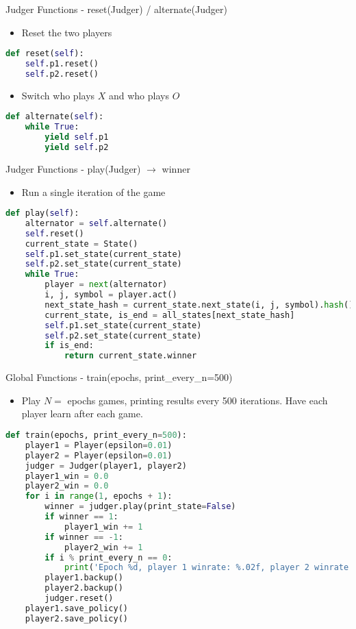 \documentclass{beamer}
\begin{document}
\begin{frame}[fragile]{Judger Functions - reset(Judger) / alternate(Judger)}
\begin{itemize}
	\item Reset the two players
\end{itemize}
\begin{lstlisting}[language=Python]
def reset(self):
    self.p1.reset()
    self.p2.reset()
\end{lstlisting}
\begin{itemize}
	\item Switch who plays $X$ and who plays $O$
\end{itemize}
\begin{lstlisting}[language=Python]
def alternate(self):
    while True:
        yield self.p1
        yield self.p2
\end{lstlisting}
\end{frame}
\begin{frame}[fragile]{Judger Functions - play(Judger) $\to$ winner}
\begin{itemize}
	\item Run a single iteration of the game
\end{itemize}
\begin{lstlisting}[language=Python]
def play(self):
    alternator = self.alternate()
    self.reset()
    current_state = State()
    self.p1.set_state(current_state)
    self.p2.set_state(current_state)
    while True:
        player = next(alternator)
        i, j, symbol = player.act()
        next_state_hash = current_state.next_state(i, j, symbol).hash()
        current_state, is_end = all_states[next_state_hash]
        self.p1.set_state(current_state)
        self.p2.set_state(current_state)
        if is_end:
            return current_state.winner
\end{lstlisting}
\end{frame}
\begin{frame}[fragile]{Global Functions - train(epochs, print\_every\_n=500)}
	\begin{itemize}
		\item Play $N = $ epochs games, printing results every 500 iterations. Have each player learn after each game.
	\end{itemize}
\begin{lstlisting}[language=Python]
def train(epochs, print_every_n=500):
    player1 = Player(epsilon=0.01)
    player2 = Player(epsilon=0.01)
    judger = Judger(player1, player2)
    player1_win = 0.0
    player2_win = 0.0
    for i in range(1, epochs + 1):
        winner = judger.play(print_state=False)
        if winner == 1:
            player1_win += 1
        if winner == -1:
            player2_win += 1
        if i % print_every_n == 0:
            print('Epoch %d, player 1 winrate: %.02f, player 2 winrate: %.02f' % (i, player1_win / i, player2_win / i))
        player1.backup()
        player2.backup()
        judger.reset()
    player1.save_policy()
    player2.save_policy()
\end{lstlisting}
\end{frame}
\end{document}

